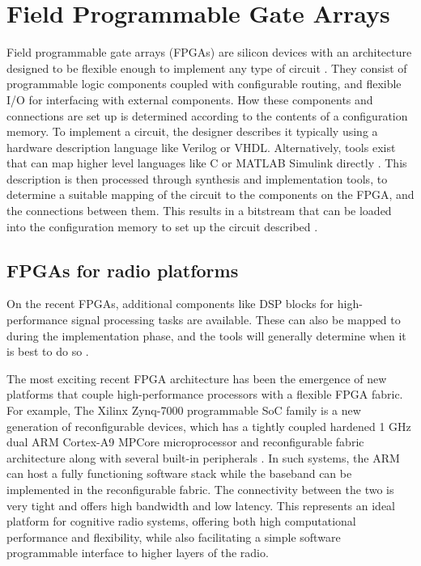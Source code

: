 \section{Field Programmable Gate Arrays }
Field programmable gate arrays (FPGAs) are silicon devices with an architecture designed to be flexible enough to implement any type of circuit \cite{Kuon2008}.
They consist of programmable logic components coupled with configurable routing, and flexible I/O for interfacing with external components.
How these components and connections are set up is determined according to the contents of a configuration memory.
To implement a circuit, the designer describes it typically using a hardware description language like Verilog or VHDL.
Alternatively, tools exist that can map higher level languages like C or MATLAB Simulink directly \cite{Springer2008}.
This description is then processed through synthesis and implementation tools, to determine a suitable mapping of the circuit to the components on the FPGA, and the connections between them.
This results in a bitstream that can be loaded into the configuration memory to set up the circuit described \cite{Xilinx2013c}.
\subsection{FPGAs for radio platforms}
On the recent FPGAs, additional components like DSP blocks for high-performance signal processing tasks are available.
These can also be mapped to during the implementation phase, and the tools will generally determine when it is best to do so \cite{Xilinx2013d}.

The most exciting recent FPGA architecture has been the emergence of new platforms that couple high-performance processors with a flexible FPGA fabric.
For example, The Xilinx Zynq-7000 programmable SoC family is a new generation of reconfigurable devices, which has a tightly coupled hardened 1 GHz dual ARM Cortex-A9 MPCore microprocessor and reconfigurable fabric architecture along with several built-in peripherals \cite{Xilinx2013}.
In such systems, the ARM can host a fully functioning software stack while the baseband can be implemented in the reconfigurable fabric. The connectivity between the two is very tight and offers high bandwidth and low latency. This represents an ideal platform for cognitive radio systems, offering both high computational performance and flexibility, while also facilitating a simple software programmable interface to higher layers of the radio.


